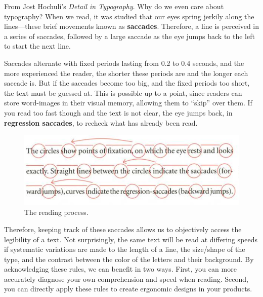 
From Jost Hochuli's \textit{Detail in Typography}. Why do we even care about typography?  When we read, it was studied that our eyes spring jerkily along the lines---these brief movements known as \textbf{saccades}. Therefore, a line is perceived in a series of saccades, followed by a large saccade as the eye jumps back to the left to start the next line. 

Saccades alternate with fixed periods lasting from 0.2 to 0.4 seconds, and the more experienced the reader, the shorter these periods are and the longer each saccade is. But if the saccades become too big, and the fixed periods too short, the text must be guessed at. This is possible up to a point, since readers can store word-images in their visual memory, allowing them to ``skip'' over them. If you read too fast though and the text is not clear, the eye jumps back, in \textbf{regression saccades}, to recheck what has already been read. 

\begin{figure}[H]
  \centering 
  \includegraphics[scale=0.4]{img/saccade.png}
  \caption{The reading process.} 
  \label{fig:saccade}
\end{figure}

Therefore, keeping track of these saccades allows us to objectively access the legibility of a text. Not surprisingly, the same text will be read at differing speeds if systematic variations are made to the length of a line, the size/shape of the type, and the contrast between the color of the letters and their background. By acknowledging these rules, we can benefit in two ways. First, you can more accurately diagnose your own comprehension and speed when reading. Second, you can directly apply these rules to create ergonomic designs in your products. 
